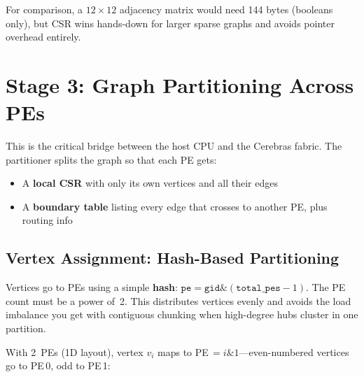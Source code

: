 \documentclass[11pt,letterpaper]{article}
\begin{document}
For comparison, a $12 \times 12$ adjacency matrix would need 144 bytes (booleans only), but CSR wins hands-down for larger sparse graphs and avoids pointer overhead entirely.

\section{Stage 3: Graph Partitioning Across PEs}
\label{sec:partition}

This is the critical bridge between the host CPU and the Cerebras fabric. The partitioner splits the graph so that each PE gets:
\begin{itemize}[nosep]
  \item A \textbf{local CSR} with only its own vertices and all their edges
  \item A \textbf{boundary table} listing every edge that crosses to another PE, plus routing info
\end{itemize}

\subsection{Vertex Assignment: Hash-Based Partitioning}

Vertices go to PEs using a simple \textbf{hash}: $\texttt{pe} = \texttt{gid} \mathbin{\&} (\texttt{total\_pes} - 1)$. The PE count must be a power of~2. This distributes vertices evenly and avoids the load imbalance you get with contiguous chunking when high-degree hubs cluster in one partition.

With 2~PEs (1D layout), vertex $v_i$ maps to PE\,$= i \mathbin{\&} 1$---even-numbered vertices go to PE\,0, odd to PE\,1:

\begin{center}
\end{center}
\end{document}
